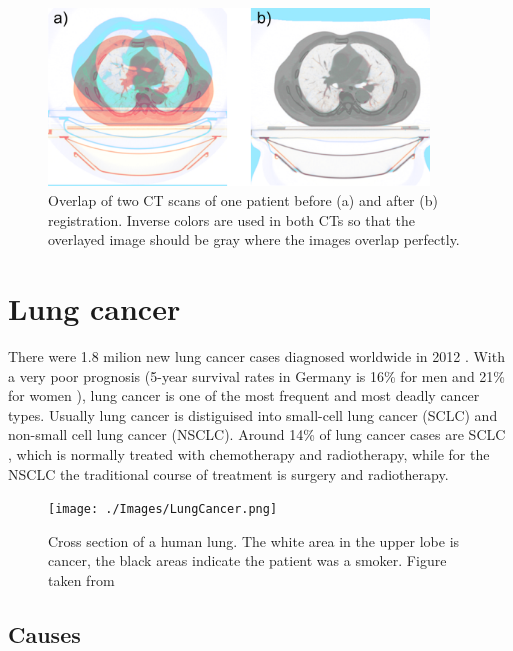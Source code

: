 \documentclass[type=dr, dr=rernat, accentcolor=tud7b,colorbacktitle, bigchapter, openright, twoside, 12pt ]{tudthesis}
\begin{document}
\begin{figure}[H]
\begin{center}
\includegraphics[width=0.9\textwidth]{./Images/RegistrationCompare.png}
\caption{Overlap of two CT scans of one patient before (a) and after (b) registration. Inverse colors are used in both CTs so that the overlayed image should be gray
where the images overlap perfectly.}
\label{RegistrationCompare}
\end{center}
\end{figure}

\section{Lung cancer}

There were 1.8 milion new lung cancer cases diagnosed worldwide in 2012 \cite{Worldwide2012}. With a very poor prognosis (5-year survival rates in Germany is 
16\% for men and 21\% for women \cite{Kaatsch2014}), lung cancer is one of the most frequent and most deadly cancer types. Usually lung cancer is distiguised
into small-cell lung cancer (SCLC) and non-small cell lung cancer (NSCLC). Around 14\% of lung cancer cases are SCLC \cite{Tsao2008}, which is normally treated with chemotherapy and radiotherapy, while for the NSCLC the traditional course of treatment
is surgery and radiotherapy.

\begin{figure}[H]
	\begin{center}
		\texttt{[image: ./Images/LungCancer.png]}
		\caption{Cross section of a human lung. The white area in the upper lobe is cancer, the black areas indicate the patient was a smoker. Figure taken from \cite{LungCancer}}
		\label{Fig:Stages}
	\end{center}
\end{figure}


\subsection{Causes}
\end{document}
